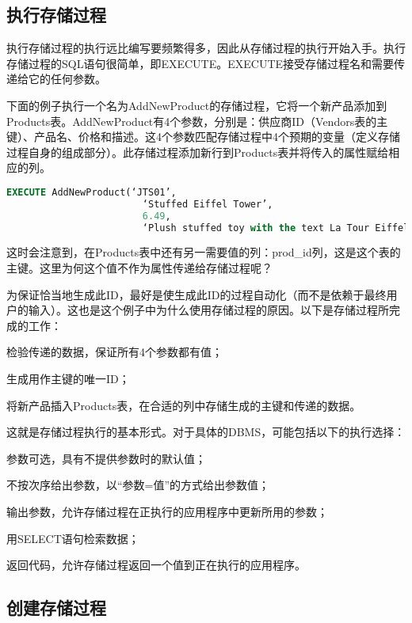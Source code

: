 \subsection{执行存储过程}

执行存储过程的执行远比编写要频繁得多，因此从存储过程的执行开始入手。执行存储过程的SQL语句很简单，即EXECUTE。EXECUTE接受存储过程名和需要传递给它的任何参数。

下面的例子执行一个名为AddNewProduct的存储过程，它将一个新产品添加到Products表。AddNewProduct有4个参数，分别是：供应商ID（Vendors表的主键）、产品名、价格和描述。这4个参数匹配存储过程中4个预期的变量（定义存储过程自身的组成部分）。此存储过程添加新行到Products表并将传入的属性赋给相应的列。

\begin{lstlisting}[language=SQL]
EXECUTE AddNewProduct(‘JTS01’,
						‘Stuffed Eiffel Tower’,
						6.49,
						‘Plush stuffed toy with the text La Tour Eiffel in red white and blue’)
\end{lstlisting}


这时会注意到，在Products表中还有另一需要值的列：prod\_id列，这是这个表的主键。这里为何这个值不作为属性传递给存储过程呢？

为保证恰当地生成此ID，最好是使生成此ID的过程自动化（而不是依赖于最终用户的输入）。这也是这个例子中为什么使用存储过程的原因。以下是存储过程所完成的工作：

\begin{compactitem}
\item 检验传递的数据，保证所有4个参数都有值；
\item 生成用作主键的唯一ID；
\item 将新产品插入Products表，在合适的列中存储生成的主键和传递的数据。
\end{compactitem}

这就是存储过程执行的基本形式。对于具体的DBMS，可能包括以下的执行选择：

\begin{compactitem}
\item 参数可选，具有不提供参数时的默认值；
\item 不按次序给出参数，以“参数=值”的方式给出参数值；
\item 输出参数，允许存储过程在正执行的应用程序中更新所用的参数；
\item 用SELECT语句检索数据；
\item 返回代码，允许存储过程返回一个值到正在执行的应用程序。
\end{compactitem}

\subsection{创建存储过程}


